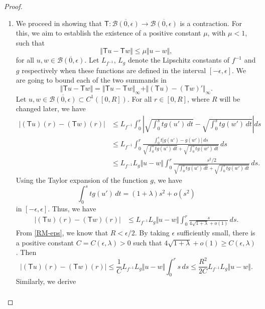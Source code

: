 \documentclass[12pt]{amsart}
\def\t{\mathsf T}
\theoremstyle{definition}
\begin{document}
\begin{proof}
\begin{enumerate}
\item We proceed in showing that $\t: \overline{\mathcal{B}(0,\epsilon )} \to \overline{\mathcal{B}(0,\epsilon )}$ is a contraction. For this, we aim to establish the existence of a positive constant $\mu$, with $\mu<1$, such that
$$
\Vert \t u - \t w \Vert \leq \mu \Vert  u - w \Vert ,
$$
for all $u,w \in \overline{\mathcal{B}(0,\epsilon )}$. Let $L_{f^{-1}}$,  $L_g $   denote the Lipschitz constants of $f^{-1}$ and $g$ respectively when these functions are defined in the interval $[-\epsilon,\epsilon]$. We are going to bound each of the two summands in  
$$
\Vert \t u - \t w \Vert = \Vert \t u - \t w \Vert_\infty + \Vert (\t u) - (\t w)' \Vert_\infty .
$$
Let $u,w\in \overline{\mathcal{B}(0,\epsilon )}\subset C^1([0,R])$.   For all $r \in [0,R]$, where $R$ will be changed later, we have
\begin{equation*}
\begin{split}
|(\t u) (r)- (\t w)(r)| &\leq L_{f^{-1}}  \int_0^r\left|\sqrt{ \int_0^s  t  g(u') \, dt}- \sqrt{ \int_0^s  t  g(w') \, dt}\right| ds  \\
&\leq L_{f^{-1}}\int_0^r \frac{\int_0^st|g(u')-g(w')|\, ds}{\sqrt{ \int_0^s  t  g(u') \, dt}+ \sqrt{ \int_0^s  t  g(w') \, dt}}\, ds   \\
&\leq L_{f^{-1}} L_g \Vert u-w  \Vert  \int_0^r \frac{s^2/2}{\sqrt{ \int_0^s  t  g(u') \, dt}+ \sqrt{ \int_0^s  t  g(w') \, dt}}\, ds.
\end{split}
\end{equation*}
Using the Taylor expansion of the function $g$, we have 
$$\int_0^s tg(u')\, dt=   (1+\lambda)s^2+o(s^2)$$
in $[-\epsilon,\epsilon]$. 
Thus, we have 
\begin{equation*}
\begin{split}
|(\t u) (r)- (\t w)(r)| & \leq L_{f^{-1}} L_g \Vert u-w  \Vert  \int_0^r \frac{s}{4\sqrt{1+\lambda}+o(1) }\, ds.
\end{split}
\end{equation*}
From \eqref{RM-eps}, we know that  $R<\epsilon/2$. By taking $\epsilon$ sufficiently small, there is a positive constant $C=C(\epsilon,\lambda)>0$ such that $4\sqrt{1+\lambda}+o(1)\geq C(\epsilon,\lambda)$. Then
\begin{equation}\label{ss1}
|(\t u) (r)- (\t w)(r)|  \leq \frac{1}{C} L_{f^{-1}} L_g \Vert u-w  \Vert \int_0^r s\, ds\leq \frac{R^2}{2C}L_{f^{-1}} L_g \Vert u-w  \Vert.
\end{equation}
Similarly, we derive 
\begin{equation}\label{ss2}
\begin{split}

\end{split}
\end{equation}
\end{enumerate}
\end{proof}
\end{document}
